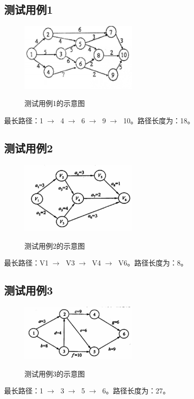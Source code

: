 \documentclass{article}
\begin{document}
\subsection{测试用例1}
\begin{figure}[H]
	\centering
	{\includegraphics[width=0.5\textwidth]{example1.png}} 
	\caption{测试用例1的示意图} 
\end{figure}
最长路径：1$\;\longrightarrow \; $ 4$\;\longrightarrow \; $ 6$\;\longrightarrow \; $ 9$\;\longrightarrow \; $ 10。路径长度为：18。

\subsection{测试用例2}
\begin{figure}[H]
	\centering
	{\includegraphics[width=0.5\textwidth]{example2.png}} 
	\caption{测试用例2的示意图} 
\end{figure}
最长路径：V1$\;\longrightarrow \; $ V3$\;\longrightarrow \; $ V4$\;\longrightarrow \; $ V6。路径长度为：8。

\subsection{测试用例3}
\begin{figure}[H]
	\centering
	{\includegraphics[width=0.5\textwidth]{example3.png}} 
	\caption{测试用例3的示意图} 
\end{figure}
最长路径：1$\;\longrightarrow \; $ 3$\;\longrightarrow \; $ 5$\;\longrightarrow \; $ 6。路径长度为：27。
\end{document}

